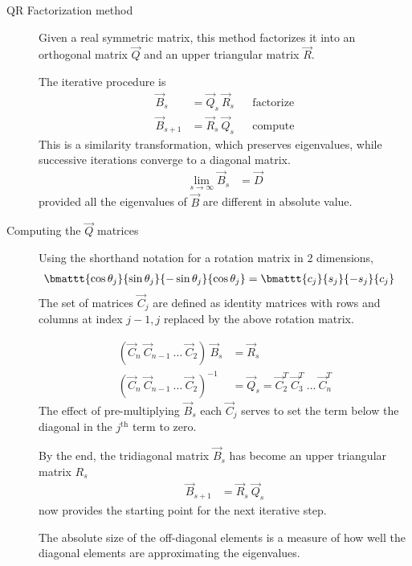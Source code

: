 \begin{description}
    \item[QR Factorization method] Given a real symmetric matrix, this method factorizes
        it into an orthogonal matrix $ \vec{Q} $ and an upper triangular matrix
        $ \vec{R} $. \par
        The iterative procedure is
        \begin{align}
            \vec{B}_s     & = \vec{Q}_s\ \vec{R}_s &  & \text{factorize} \\
            \vec{B}_{s+1} & = \vec{R}_s\ \vec{Q}_s &  & \text{compute}
        \end{align}
        This is a similarity transformation, which preserves eigenvalues, while
        successive iterations converge to a diagonal matrix.
        \begin{align}
            \lim_{s \to \infty} \vec{B}_s & = \vec{D}
        \end{align}
        provided all the eigenvalues of $ \vec{B} $ are different in absolute value.

    \item[Computing the $\vec{Q}$ matrices] Using the shorthand notation for a rotation
        matrix in 2 dimensions,
        \begin{align}
            \bmattt{\cos\theta_j}{\sin\theta_j}{-\sin\theta_j}{\cos\theta_j}
             & = \bmattt{c_j}{s_j}{-s_j}{c_j}
        \end{align}
        The set of matrices $ \vec{C}_j $ are defined as identity matrices with rows
        and columns at index $ j-1, j $ replaced by the above rotation matrix.

        \begin{align}
            (\vec{C}_n\ \vec{C}_{n-1}\ \dots\ \vec{C}_2)\ \vec{B}_s & = \vec{R}_s \\
            (\vec{C}_n\ \vec{C}_{n-1}\ \dots\ \vec{C}_2)^{-1}       & = \vec{Q}_s
            = \vec{C}_2^T\ \vec{C}_3^T\ \dots\ \vec{C}_n^T
        \end{align}
        The effect of pre-multiplying $ \vec{B}_s $ each $ \vec{C}_j $ serves to set the
        term below the diagonal in the $ j^{\text{th}} $ term to zero. \par
        By the end, the tridiagonal matrix $ \vec{B}_s $ has become an upper triangular
        matrix $ R_s $
        \begin{align}
            \vec{B}_{s+1} & = \vec{R}_s\ \vec{Q}_s
        \end{align}
        now provides the starting point for the next iterative step.\par
        The absolute size of the off-diagonal elements is a measure of how well the
        diagonal elements are approximating the eigenvalues.
\end{description}